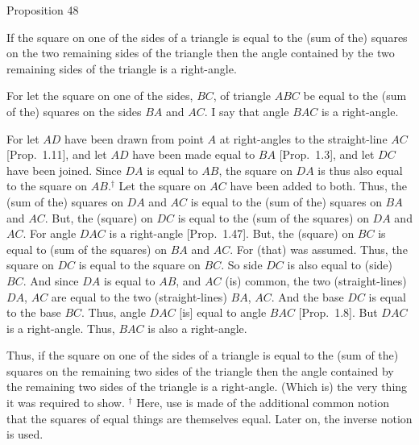 
\begin{center}
{\large Proposition 48}
\end{center}

If the square on one of the sides of a triangle is equal to the (sum of the)
squares on the two remaining sides of the triangle then the angle contained
by the two remaining sides of the triangle is a right-angle.

\epsfysize=1.9in
\centerline{}

For let the square on one of the sides, $BC$, of triangle $ABC$ be equal
to the (sum of the) squares on the sides $BA$ and $AC$. I say that angle
$BAC$ is a right-angle.

For let $AD$ have been drawn from point $A$ at right-angles to the
straight-line $AC$ [Prop.~1.11], and let $AD$ have been made equal to
$BA$ [Prop.~1.3], and let $DC$ have been joined. Since $DA$ is equal to $AB$,
the square on $DA$ is thus also equal to the square on $AB$.$^\dag$ Let the square on
$AC$ have been added to both. Thus, the (sum of the) squares on $DA$ and $AC$ is equal
to the (sum of the) squares on $BA$ and $AC$. But, the (square) on $DC$ 
is equal to the (sum of the squares) on $DA$ and $AC$. For angle $DAC$ is a right-angle [Prop.~1.47].
But, the  (square) on $BC$ is equal to (sum of the squares) on $BA$ and $AC$.
For (that) was assumed. Thus, the square on $DC$ is equal to the square on $BC$.
So  side $DC$ is also equal to (side) $BC$. And since $DA$ is equal to $AB$, and $AC$ (is) common, the two (straight-lines) $DA$, $AC$ are equal to the two (straight-lines)
$BA$, $AC$. And the base $DC$ is equal to the base $BC$. Thus, angle $DAC$ [is] equal to angle $BAC$ [Prop.~1.8].  But $DAC$ is a right-angle. Thus, $BAC$ is
also a right-angle.

Thus, if the square on one of the sides of a triangle is equal to the (sum of the)
squares on the remaining two sides of the triangle then the angle contained
by the remaining two sides of the triangle is a right-angle. (Which is) the very thing
it was required to show.
{\footnotesize \noindent$^\dag$ Here, use is made of the additional common notion that the squares of equal things are
themselves equal. Later on, the inverse notion is used.} 
